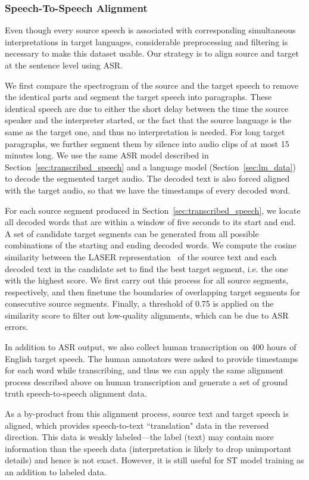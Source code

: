 \documentclass[11pt,a4paper]{article}
\begin{document}
\subsubsection{Speech-To-Speech Alignment}
Even though every source speech is associated with corresponding simultaneous interpretations in target languages, considerable preprocessing and filtering is necessary to make this dataset usable. Our strategy is to align source and target at the sentence level using ASR.

We first compare the spectrogram of the source and the target speech to remove the identical parts and segment the target speech into paragraphs. These identical speech are due to either the short delay between the time the source speaker and the interpreter started, or the fact that the source language is the same as the target one, and thus no interpretation is needed. For long target paragraphs, we further segment them by silence into audio clips of at most 15 minutes long. We use the same ASR model described in Section~\ref{sec:transcribed_speech} and a language model (Section~\ref{sec:lm_data}) to decode the segmented target audio. The decoded text is also forced aligned with the target audio, so that we have the timestamps of every decoded word. 

For each source segment produced in Section~\ref{sec:transcribed_speech}, we locate all decoded words that are within a window of five seconds to its start and end. A set of candidate target segments can be generated from all possible combinations of the starting and ending decoded words. We compute the cosine similarity between the LASER representation~\citep{artetxe2019massively} of the source text and each decoded text in the candidate set to find the best target segment, i.e. the one with the highest score. We first carry out this process for all source segments, respectively, and then finetune the boundaries of overlapping target segments for consecutive source segments. Finally, a threshold of 0.75 is applied on the similarity score to filter out low-quality alignments, which can be due to ASR errors.

In addition to ASR output, we also collect human transcription on 400 hours of English target speech. The human annotators were asked to provide timestamps for each word while transcribing, and thus we can apply the same alignment process described above on human transcription and generate a set of ground truth speech-to-speech alignment data.

As a by-product from this alignment process, source text and target speech is aligned, which provides speech-to-text ``translation" data in the reversed direction. This data is weakly labeled---the label (text) may contain more information than the speech data (interpretation is likely to drop unimportant details) and hence is not exact. However, it is still useful for ST model training as an addition to labeled data.


\end{document}
